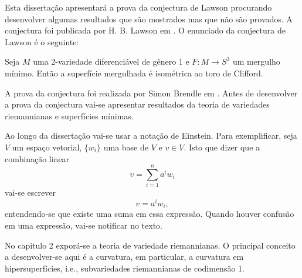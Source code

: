 Esta dissertação apresentará a prova da conjectura de Lawson procurando desenvolver algumas resultados que são mostrados mas que não são provados. A conjectura foi publicada por H. B. Lawson em \cite{Lawson1970a}.
O enunciado da conjectura de Lawson é o seguinte:
\begin{teorema}\label{teo:Lawson}
	Seja
	$M$ uma 2-variedade diferenciável de gênero 1 e
	$F:M \rightarrow S^3$ um mergulho mínimo.
	Então a superfície mergulhada é isométrica ao toro de Clifford.
\end{teorema}
A prova da conjectura foi realizada por Simon Brendle em \cite{Brendle2013a}.
Antes de desenvolver a prova da conjectura vai-se apresentar resultados da teoria de variedades riemannianas e superfícies mínimas.

Ao longo da dissertação vai-se usar a notação de Einstein. 
Para exemplificar, seja $V$ um espaço vetorial,
$\{w_i\}$ uma base de $V$ e
$v \in V$.
Isto que dizer que a combinação linear
\begin{equation*}
	v = \sum_{i=1}^n a^i w_i
\end{equation*}
vai-se escrever
\begin{equation*}
	v = a^i w_i,
\end{equation*}
entendendo-se que existe uma suma em essa expressão.
Quando houver confusão em uma expressão, vai-se notificar no texto.

No capitulo 2 exporá-se a teoria de variedade riemannianas. O principal conceito a desenvolver-se aqui é a curvatura, em particular, a curvatura em hipersuperfícies, i.e., subvariedades riemannianas de codimensão 1.

